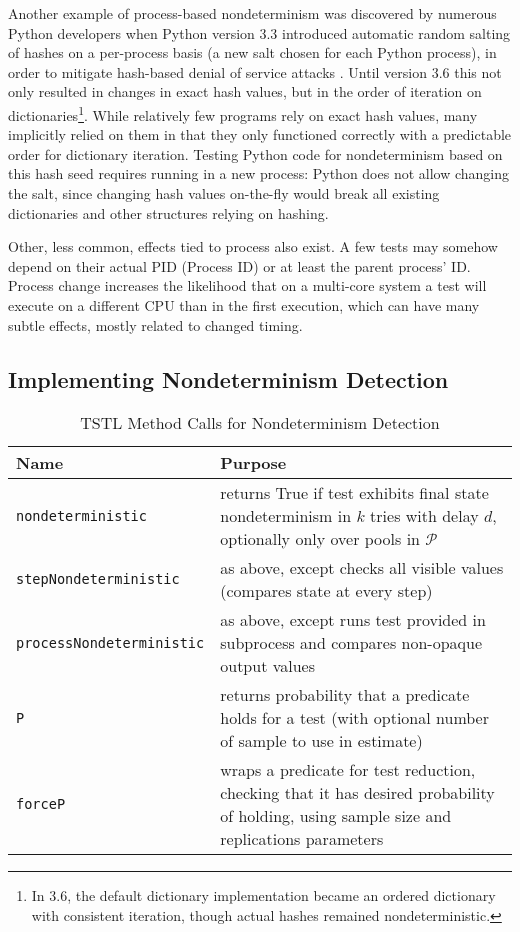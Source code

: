 Another example of process-based nondeterminism was discovered by numerous Python developers when Python
version 3.3 introduced automatic random salting of hashes on a
per-process basis (a new salt chosen for each Python process),
in order to mitigate hash-based denial of service attacks
\cite{denial}.  Until version 3.6 this not only resulted in changes in
exact hash values, but in the order of iteration on
dictionaries\footnote{In 3.6, the default dictionary
  implementation became an ordered dictionary with consistent
  iteration, though actual hashes remained nondeterministic.}.  While
relatively few programs rely on exact hash values, many implicitly
relied on them in that they only functioned correctly with a
predictable order for dictionary iteration.  Testing
Python code for nondeterminism based on this hash seed requires
running in a new process:  Python does not allow changing the salt, since changing hash values on-the-fly would
break all existing dictionaries and other structures relying on
hashing.

Other, less common, effects tied to process also exist.  A few tests
may somehow depend on their actual PID (Process ID) or at least the
parent process' ID.  Process change increases the likelihood that on a multi-core
system a test will execute on a different CPU than in the first
execution, which can have many subtle effects, mostly related to
changed timing.

\subsection{Implementing Nondeterminism Detection}


\begin{table*}
\centering
{\scriptsize 

\caption{TSTL Method Calls for Nondeterminism Detection}
\label{tab:methods}
\begin{tabular}{l|l}
Name & Purpose \\
\hline
\hline
{\tt nondeterministic} & returns True if test exhibits final state nondeterminism in $k$
  tries with delay $d$, optionally only over pools in $\mathcal{P}$\\
\hline
{\tt stepNondeterministic} & as above, except checks all visible values
                       (compares state at every step)\\
\hline
{\tt processNondeterministic} & as above, except runs test provided in
                          subprocess and compares non-opaque output
                          values \\
\hline
{\tt P} & returns probability that a predicate holds for a test (with
          optional number of sample to use in estimate) \\
\hline
{\tt forceP} & wraps a predicate for test reduction, checking that it
               has desired probability of holding, using
         sample size and replications parameters \\
\hline
\hline

\end{tabular}
}
\end{table*}

